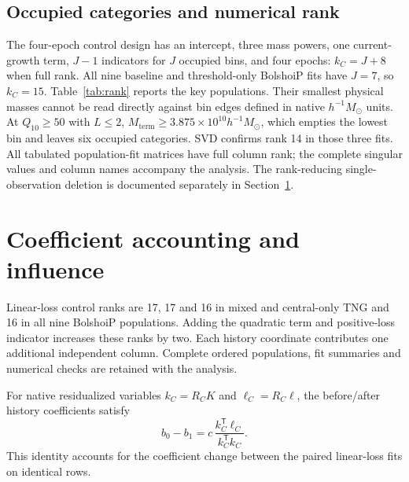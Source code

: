 \documentclass[11pt,a4paper]{article}
\newcommand{\Mterm}{M_{\mathrm{term}}}
\begin{document}
\subsection{Occupied categories and numerical rank}\label{app:rank}
The four-epoch control design has an intercept, three mass powers, one current-growth term, $J-1$ indicators for $J$ occupied bins, and four epochs: $k_C=J+8$ when full rank. All nine baseline and threshold-only BolshoiP fits have $J=7$, so $k_C=15$. Table~\ref{tab:rank} reports the key populations. Their smallest physical masses cannot be read directly against bin edges defined in native $h^{-1}M_\odot$ units. At $Q_{10}\geq50$ with $L\leq2$, $\Mterm\geq3.875\times10^{10}h^{-1}M_\odot$, which empties the lowest bin and leaves six occupied categories. SVD confirms rank 14 in those three fits. All tabulated population-fit matrices have full column rank; the complete singular values and column names accompany the analysis. The rank-reducing single-observation deletion is documented separately in Section~\ref{sup:influence}.
\begin{table}[htbp]\centering\small

\caption{BolshoiP control ranks and occupancy of the native $10.0$--$10.5$ logarithmic terminal-mass bin. The $Q_{10}\geq50$ threshold alone preserves the bin. Adding $L\leq2$ removes it, and the actual control rank decreases accordingly.}\label{tab:rank}
\end{table}

\section{Coefficient accounting and influence}\label{sup:influence}
Linear-loss control ranks are 17, 17 and 16 in mixed and central-only TNG and 16 in all nine BolshoiP populations. Adding the quadratic term and positive-loss indicator increases these ranks by two. Each history coordinate contributes one additional independent column. Complete ordered populations, fit summaries and numerical checks are retained with the analysis.

For native residualized variables $k_C=R_CK$ and $\ell_C=R_C\ell$, the before/after history coefficients satisfy
\begin{equation}
b_0-b_1=c\,\frac{k_C^{\mathsf T}\ell_C}{k_C^{\mathsf T}k_C}.\label{eq:ovb}
\end{equation}
This identity accounts for the coefficient change between the paired linear-loss fits on identical rows.
\end{document}
